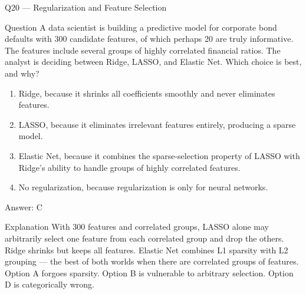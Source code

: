\documentclass[aspectratio=169,8pt]{beamer}
\begin{document}
	\begin{frame}{Q20 --- Regularization and Feature Selection}
		\begin{block}{Question}
			A data scientist is building a predictive model for corporate bond defaults with 300 candidate features, of which perhaps 20 are truly informative. The features include several groups of highly correlated financial ratios. The analyst is deciding between Ridge, LASSO, and Elastic Net. Which choice is best, and why?
		\end{block}
		\begin{enumerate}
			\item Ridge, because it shrinks all coefficients smoothly and never eliminates features.
			\item LASSO, because it eliminates irrelevant features entirely, producing a sparse model.
			\item Elastic Net, because it combines the sparse-selection property of LASSO with Ridge's ability to handle groups of highly correlated features.
			\item No regularization, because regularization is only for neural networks.
		\end{enumerate}
		\begin{exampleblock}{Answer: C}\end{exampleblock}
		\begin{block}{Explanation}
			With 300 features and correlated groups, LASSO alone may arbitrarily select one feature from each correlated group and drop the others. Ridge shrinks but keeps all features. Elastic Net combines L1 sparsity with L2 grouping --- the best of both worlds when there are correlated groups of features. Option A forgoes sparsity. Option B is vulnerable to arbitrary selection. Option D is categorically wrong.
		\end{block}
	\end{frame}
	
\end{document}
